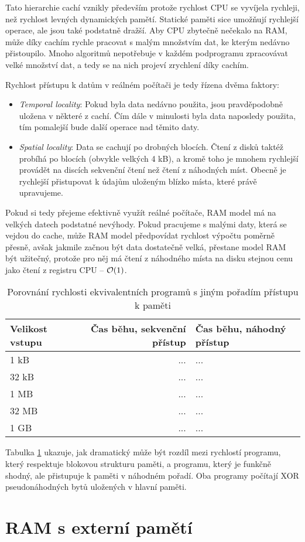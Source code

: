 Tato hierarchie cachí vznikly především protože rychlost CPU se vyvíjela rychleji,
než rychlost levných dynamických pamětí. Statické paměti sice umožňují rychlejší
operace, ale jsou také podstatně dražší. Aby CPU zbytečně nečekalo na RAM, může
díky cachím rychle pracovat s malým množstvím dat, ke kterým nedávno přistoupilo.
Mnoho algoritmů nepotřebuje v každém podprogramu zpracovávat velké množství dat,
a tedy se na nich projeví zrychlení díky cachím.

Rychlost přístupu k datům v reálném počítači je tedy řízena dvěma faktory:
\begin{itemize}
\item
	\textit{Temporal locality}: Pokud byla data nedávno použita, jsou
	pravděpodobně uložena v některé z cachí. Čím dále v minulosti byla
	data naposledy použita, tím pomalejší bude další operace nad těmito
	daty.
\item
	\textit{Spatial locality}: Data se cachují po drobných blocích. Čtení
	z disků taktéž probíhá po blocích (obvykle velkých 4 kB), a kromě
	toho je mnohem rychlejší provádět na discích sekvenční čtení než čtení
	z náhodných míst. Obecně je rychlejší přistupovat k údajům uloženým
	blízko místa, které právě upravujeme.
\end{itemize}

Pokud si tedy přejeme efektivně využít reálné počítače, RAM model má na velkých
datech podstatné nevýhody. Pokud pracujeme s malými daty, která se vejdou
do cache, může RAM model předpovídat rychlost výpočtu poměrně přesně, avšak
jakmile začnou být data dostatečně velká, přestane model RAM být užitečný,
protože pro něj má čtení z náhodného místa na disku stejnou cenu jako čtení
z registru CPU -- $\mathcal{O}(1)$.

\begin{table}
	\centering
	\begin{tabular}{l|r|l}
	Velikost vstupu & Čas běhu, sekvenční přístup & Čas běhu, náhodný
		přístup \\
	\hline
	1 kB & ... & ... \\
	32 kB & ... & ... \\
	1 MB & ... & ... \\
	32 MB & ... & ... \\
	1 GB & ... & ... \\
	\end{tabular}
	\label{tbl:apatterns}
	\caption{Porovnání rychlosti ekvivalentních programů s jiným pořadím
	přístupu k paměti}
\end{table}

Tabulka \ref{tbl:apatterns} ukazuje, jak dramatický může být
rozdíl mezi rychlostí programu, který respektuje blokovou strukturu paměti,
a programu, který je funkčně shodný, ale přistupuje k paměti v náhodném pořadí.
Oba programy počítají XOR pseudonáhodných bytů uložených v hlavní paměti.

\section{RAM s externí pamětí}

\clearpage
